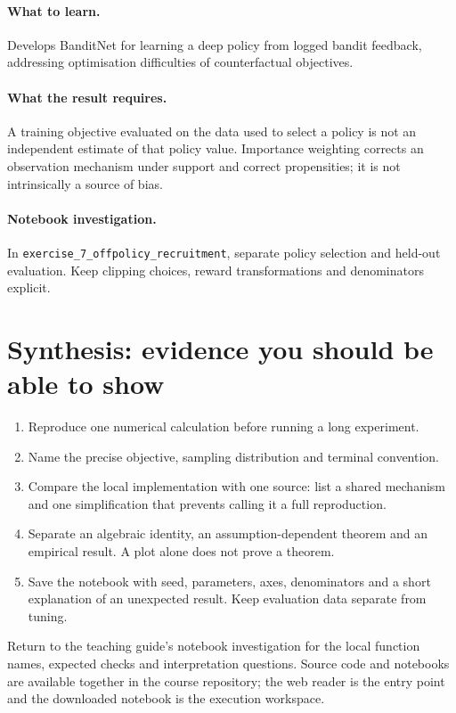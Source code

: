 \documentclass[11pt]{scrartcl}
\begin{document}
\paragraph{What to learn.} Develops BanditNet for learning a deep policy from logged bandit feedback, addressing optimisation difficulties of counterfactual objectives.

\paragraph{What the result requires.} A training objective evaluated on the data used to select a policy is not an independent estimate of that policy value. Importance weighting corrects an observation mechanism under support and correct propensities; it is not intrinsically a source of bias.

\paragraph{Notebook investigation.} In \texttt{exercise\_7\_offpolicy\_recruitment}, separate policy selection and held-out evaluation. Keep clipping choices, reward transformations and denominators explicit.

\section*{Synthesis: evidence you should be able to show}
\begin{enumerate}
\item Reproduce one numerical calculation before running a long experiment.
\item Name the precise objective, sampling distribution and terminal convention.
\item Compare the local implementation with one source: list a shared mechanism
and one simplification that prevents calling it a full reproduction.
\item Separate an algebraic identity, an assumption-dependent theorem and an
empirical result. A plot alone does not prove a theorem.
\item Save the notebook with seed, parameters, axes, denominators and a short
explanation of an unexpected result. Keep evaluation data separate from tuning.
\end{enumerate}
Return to the teaching guide's notebook investigation for the local function
names, expected checks and interpretation questions. Source code and notebooks
are available together in the course repository; the web reader is the entry
point and the downloaded notebook is the execution workspace.
\end{document}
